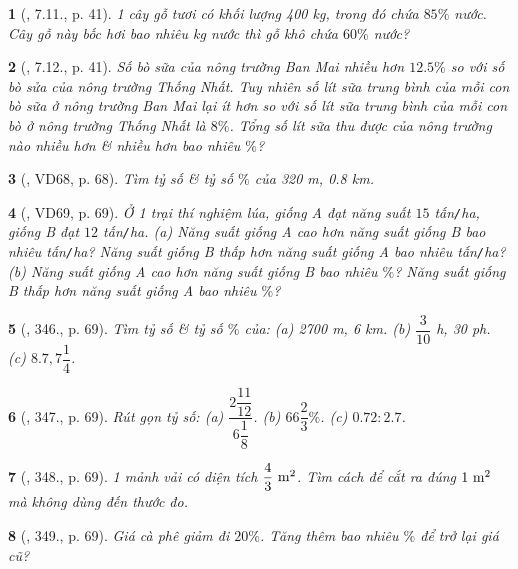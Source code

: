 \documentclass{article}
\newtheorem{baitoan}{}
\begin{document}
\begin{baitoan}[\cite{Binh_boi_duong_Toan_6_tap_2}, 7.11., p. 41]
	1 cây gỗ tươi có khối lượng {\rm400 kg}, trong đó chứa $85\%$ nước. Cây gỗ này bốc hơi bao nhiêu {\rm kg} nước thì gỗ khô chứa $60\%$ nước?
\end{baitoan}

\begin{baitoan}[\cite{Binh_boi_duong_Toan_6_tap_2}, 7.12., p. 41]
	Số bò sữa của nông trường Ban Mai nhiều hơn $12.5\%$ so với số bò sửa của nông trường Thống Nhất. Tuy nhiên số lít sữa trung bình của mỗi con bò sữa ở nông trường Ban Mai lại ít hơn so với số lít sữa trung bình của mỗi con bò ở nông trường Thống Nhất là $8\%$. Tổng số lít sữa thu được của nông trường nào nhiều hơn \& nhiều hơn bao nhiêu $\%$?
\end{baitoan}

\begin{baitoan}[\cite{Tuyen_Toan_6}, VD68, p. 68]
	Tìm tỷ số \& tỷ số $\%$ của {\rm320 m, 0.8 km}.
\end{baitoan}

\begin{baitoan}[\cite{Tuyen_Toan_6}, VD69, p. 69]
	Ở 1 trại thí nghiệm lúa, giống A đạt năng suất $15$ tấn{\tt/}ha, giống B đạt $12$ tấn{\tt/}ha. (a) Năng suất giống A cao hơn năng suất giống B bao nhiêu tấn{\tt/}ha? Năng suất giống B thấp hơn năng suất giống A bao nhiêu tấn{\tt/}ha? (b) Năng suất giống A cao hơn năng suất giống B bao nhiêu $\%$? Năng suất giống B thấp hơn năng suất giống A bao nhiêu $\%$? 
\end{baitoan}

\begin{baitoan}[\cite{Tuyen_Toan_6}, 346., p. 69]
	Tìm tỷ số \& tỷ số $\%$ của: (a) {\rm2700 m, 6 km}. (b) {\rm $\dfrac{3}{10}$ h, 30 ph}. (c) $8.7,7\dfrac{1}{4}$.
\end{baitoan}

\begin{baitoan}[\cite{Tuyen_Toan_6}, 347., p. 69]
	Rút gọn tỷ số: (a) $\dfrac{2\dfrac{11}{12}}{6\dfrac{1}{8}}$. (b) $66\dfrac{2}{3}\%$. (c) $0.72:2.7$.
\end{baitoan}

\begin{baitoan}[\cite{Tuyen_Toan_6}, 348., p. 69]
	1 mảnh vải có diện tích $\rm\dfrac{4}{3}\ m^2$. Tìm cách để cắt ra đúng $\rm1\ m^2$ mà không dùng đến thước đo.
\end{baitoan}

\begin{baitoan}[\cite{Tuyen_Toan_6}, 349., p. 69]
	Giá cà phê giảm đi $20\%$. Tăng thêm bao nhiêu $\%$ để trở lại giá cũ?
\end{baitoan}
\end{document}
